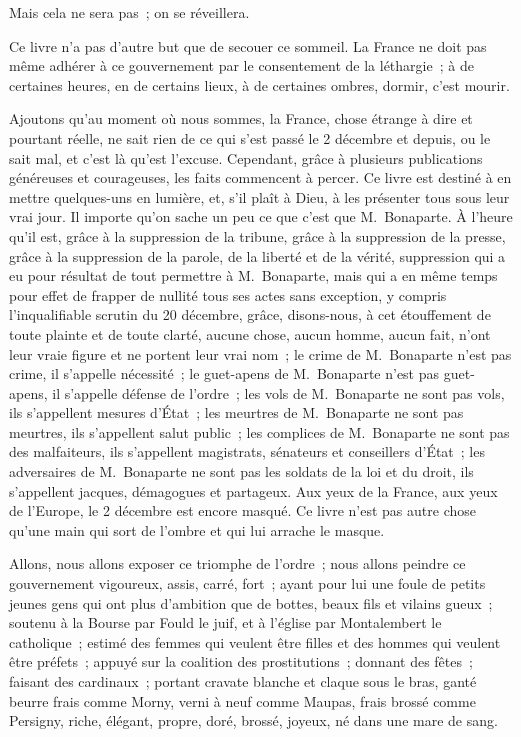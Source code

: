 \documentclass[french,twoside]{book} %
\begin{document}
Mais cela ne sera pas ; on se réveillera.\par
Ce livre n’a pas d’autre but que de secouer ce sommeil. La France ne doit pas même adhérer à ce gouvernement par le consentement de la léthargie ; à de certaines heures, en de certains lieux, à de certaines ombres, dormir, c’est mourir.\par
Ajoutons qu’au moment où nous sommes, la France, chose étrange à dire et pourtant réelle, ne sait rien de ce qui s’est passé le 2 décembre et depuis, ou le sait mal, et c’est là qu’est l’excuse. Cependant, grâce à plusieurs publications généreuses et courageuses, les faits commencent à percer. Ce livre est destiné à en mettre quelques-uns en lumière, et, s’il plaît à Dieu, à les présenter tous sous leur vrai jour. Il importe qu’on sache un peu ce que c’est que M. Bonaparte. À l’heure qu’il est, grâce à la suppression de la tribune, grâce à la suppression de la presse, grâce à la suppression de la parole, de la liberté et de la vérité, suppression qui a eu pour résultat de tout permettre à M. Bonaparte, mais qui a en même temps pour effet de frapper de nullité tous ses actes sans exception, y compris l’inqualifiable scrutin du 20 décembre, grâce, disons-nous, à cet étouffement de toute plainte et de toute clarté, aucune chose, aucun homme, aucun fait, n’ont leur vraie figure et ne portent leur vrai nom ; le crime de M. Bonaparte n’est pas crime, il s’appelle nécessité ; le guet-apens de M. Bonaparte n’est pas guet-apens, il s’appelle défense de l’ordre ; les vols de M. Bonaparte ne sont pas vols, ils s’appellent mesures d’État ; les meurtres de M. Bonaparte ne sont pas meurtres, ils s’appellent salut public ; les complices de M. Bonaparte ne sont pas des malfaiteurs, ils s’appellent magistrats, sénateurs et conseillers d’État ; les adversaires de M. Bonaparte ne sont pas les soldats de la loi et du droit, ils s’appellent jacques, démagogues et partageux. Aux yeux de la France, aux yeux de l’Europe, le 2 décembre est encore masqué. Ce livre n’est pas autre chose qu’une main qui sort de l’ombre et qui lui arrache le masque.\par
Allons, nous allons exposer ce triomphe de l’ordre ; nous allons peindre ce gouvernement vigoureux, assis, carré, fort ; ayant pour lui une foule de petits jeunes gens qui ont plus d’ambition que de bottes, beaux fils et vilains gueux ; soutenu à la Bourse par Fould le juif, et à l’église par Montalembert le catholique ; estimé des femmes qui veulent être filles et des hommes qui veulent être préfets ; appuyé sur la coalition des prostitutions ; donnant des fêtes ; faisant des cardinaux ; portant cravate blanche et claque sous le bras, ganté beurre frais comme Morny, verni à neuf comme Maupas, frais brossé comme Persigny, riche, élégant, propre, doré, brossé, joyeux, né dans une mare de sang.\par
\end{document}
